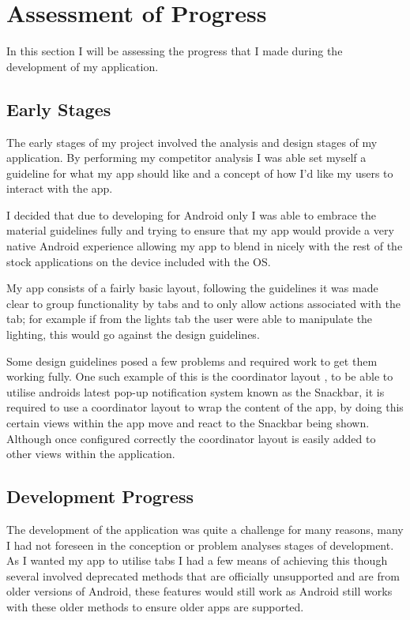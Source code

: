 \section{Assessment of Progress}\label{assessment-of-progress}

In this section I will be assessing the progress that I made during the
development of my application.

\subsection{Early Stages}\label{early-stages}

The early stages of my project involved the analysis and design stages
of my application. By performing my competitor analysis I was able set
myself a guideline for what my app should like and a concept of how I'd
like my users to interact with the app.

I decided that due to developing for Android only I was able to embrace
the material guidelines fully and trying to ensure that my app would
provide a very native Android experience allowing my app to blend in
nicely with the rest of the stock applications on the device included
with the OS.

My app consists of a fairly basic layout, following the guidelines it
was made clear to group functionality by tabs and to only allow actions
associated with the tab; for example if from the lights tab the user
were able to manipulate the lighting, this would go against the design
guidelines.

Some design guidelines posed a few problems and required work to get
them working fully. One such example of this is the coordinator layout
\parencite{coordinator}, to be able to utilise androids latest pop-up
notification system known as the Snackbar, it is required to use a
coordinator layout to wrap the content of the app, by doing this certain
views within the app move and react to the Snackbar being shown.
Although once configured correctly the coordinator layout is easily
added to other views within the application.

\subsection{Development Progress}\label{development-progress}

The development of the application was quite a challenge for many
reasons, many I had not foreseen in the conception or problem analyses
stages of development. As I wanted my app to utilise tabs I had a few
means of achieving this though several involved deprecated methods that
are officially unsupported and are from older versions of Android, these
features would still work as Android still works with these older
methods to ensure older apps are supported.


